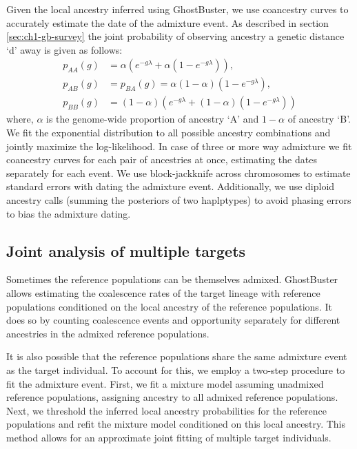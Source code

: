 Given the local ancestry inferred using GhostBuster, we use coancestry curves to accurately estimate the date of the admixture event.
%
As described in section \ref{sec:ch1-gb-survey} the joint probability of observing ancestry a genetic distance `d' away is given as follows:
\begin{equation}
\begin{aligned}
    p_{AA}(g) &= \alpha ( e^{-g\lambda} + \alpha (1-e^{-g\lambda} )), \\
    p_{AB}(g) &= p_{BA}(g) = \alpha (1 - \alpha) (1 - e^{-g\lambda}), \\
    p_{BB}(g) &= (1-\alpha) ( e^{-g\lambda} + (1-\alpha) (1-e^{-g\lambda} ))
\end{aligned}
\end{equation}
where, $\alpha$ is the genome-wide proportion of ancestry `A' and $1-\alpha$ of ancestry `B'. 
%
We fit the exponential distribution to all possible ancestry combinations and jointly maximize the log-likelihood. 
%
In case of three or more way admixture we fit coancestry curves for each pair of ancestries at once, estimating the dates separately for each event.
%
We use block-jackknife across chromosomes to estimate standard errors with dating the admixture event.
% 
Additionally, we use diploid ancestry calls (summing the posteriors of two haplptypes) to avoid phasing errors to bias the admixture dating.

\subsection{Joint analysis of multiple targets}
Sometimes the reference populations can be themselves admixed. 
%
GhostBuster allows estimating the coalescence rates of the target lineage with reference populations conditioned on the local ancestry of the reference populations. 
%
It does so by counting coalescence events and opportunity separately for different ancestries in the admixed reference populations.  

It is also possible that the reference populations share the same admixture event as the target individual. To account for this, we employ a two-step procedure to fit the admixture event. First, we fit a mixture model assuming unadmixed reference populations, assigning ancestry to all admixed reference populations. Next, we threshold the inferred local ancestry probabilities for the reference populations and refit the mixture model conditioned on this local ancestry. This method allows for an approximate joint fitting of multiple target individuals.

